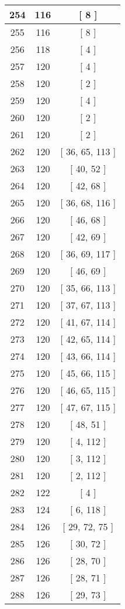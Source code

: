 \begin{center}
\begin{longtable}[H]{|| c c c ||}
\hline
254 & 116 & [ 8 ] \\ 
\hline
255 & 116 & [ 8 ] \\ 
\hline
256 & 118 & [ 4 ] \\ 
\hline
257 & 120 & [ 4 ] \\ 
\hline
258 & 120 & [ 2 ] \\ 
\hline
259 & 120 & [ 4 ] \\ 
\hline
260 & 120 & [ 2 ] \\ 
\hline
261 & 120 & [ 2 ] \\ 
\hline
262 & 120 & [ 36, 65, 113 ] \\ 
\hline
263 & 120 & [ 40, 52 ] \\ 
\hline
264 & 120 & [ 42, 68 ] \\ 
\hline
265 & 120 & [ 36, 68, 116 ] \\ 
\hline
266 & 120 & [ 46, 68 ] \\ 
\hline
267 & 120 & [ 42, 69 ] \\ 
\hline
268 & 120 & [ 36, 69, 117 ] \\ 
\hline
269 & 120 & [ 46, 69 ] \\ 
\hline
270 & 120 & [ 35, 66, 113 ] \\ 
\hline
271 & 120 & [ 37, 67, 113 ] \\ 
\hline
272 & 120 & [ 41, 67, 114 ] \\ 
\hline
273 & 120 & [ 42, 65, 114 ] \\ 
\hline
274 & 120 & [ 43, 66, 114 ] \\ 
\hline
275 & 120 & [ 45, 66, 115 ] \\ 
\hline
276 & 120 & [ 46, 65, 115 ] \\ 
\hline
277 & 120 & [ 47, 67, 115 ] \\ 
\hline
278 & 120 & [ 48, 51 ] \\ 
\hline
279 & 120 & [ 4, 112 ] \\ 
\hline
280 & 120 & [ 3, 112 ] \\ 
\hline
281 & 120 & [ 2, 112 ] \\ 
\hline
282 & 122 & [ 4 ] \\ 
\hline
283 & 124 & [ 6, 118 ] \\ 
\hline
284 & 126 & [ 29, 72, 75 ] \\ 
\hline
285 & 126 & [ 30, 72 ] \\ 
\hline
286 & 126 & [ 28, 70 ] \\ 
\hline
287 & 126 & [ 28, 71 ] \\ 
\hline
288 & 126 & [ 29, 73 ] \\ 

\end{longtable}
\end{center}
